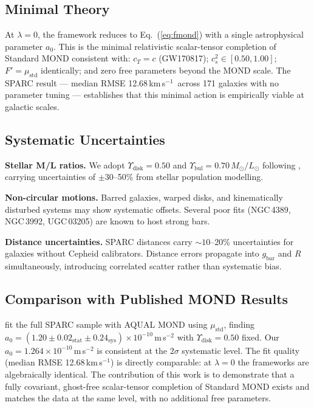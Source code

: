 \documentclass{aa}
\newcommand{\kms}{km\,s$^{-1}$}
\newcommand{\mstd}{\mu_\text{std}}
\newcommand{\gbar}{g_\text{bar}}
\newcommand{\azero}{a_0}
\newcommand{\Upd}{\Upsilon_\text{disk}}
\newcommand{\Upb}{\Upsilon_\text{bul}}
\newcommand{\cs}{c_s^2}
\begin{document}
\subsection{Minimal Theory}

At $\lambda = 0$, the framework reduces to Eq.~(\ref{eq:fmond}) with a single
astrophysical parameter $\azero$. This is the minimal relativistic
scalar-tensor completion of Standard MOND consistent with: $c_T = c$
(GW170817); $\cs \in [0.50, 1.00]$; $F' = \mstd$ identically; and zero free
parameters beyond the MOND scale. The SPARC result --- median RMSE
12.68\,\kms\ across 171 galaxies with no parameter tuning --- establishes that
this minimal action is empirically viable at galactic scales.

\subsection{Systematic Uncertainties}

\textbf{Stellar M/L ratios.} We adopt $\Upd = 0.50$ and $\Upb = 0.70\,M_\odot/L_\odot$
following \citet{McGaugh2015}, carrying uncertainties of $\pm 30$--50\%
from stellar population modelling.

\textbf{Non-circular motions.} Barred galaxies, warped disks, and kinematically
disturbed systems may show systematic offsets. Several poor fits (NGC\,4389,
NGC\,3992, UGC\,03205) are known to host strong bars.

\textbf{Distance uncertainties.} SPARC distances carry $\sim 10$--20\%
uncertainties for galaxies without Cepheid calibrators. Distance errors
propagate into $\gbar$ and $R$ simultaneously, introducing correlated scatter
rather than systematic bias.

\subsection{Comparison with Published MOND Results}

\citet{Li2018} fit the full SPARC sample with AQUAL MOND using $\mstd$,
finding $\azero = (1.20 \pm 0.02_\text{stat} \pm 0.24_\text{sys}) \times
10^{-10}$\,m\,s$^{-2}$ with $\Upd = 0.50$ fixed. Our
$\azero = 1.264 \times 10^{-10}$\,m\,s$^{-2}$ is consistent at the
$2\sigma$ systematic level. The fit quality (median RMSE 12.68\,\kms) is
directly comparable: at $\lambda = 0$ the frameworks are algebraically
identical. The contribution of this work is to demonstrate that a fully
covariant, ghost-free scalar-tensor completion of Standard MOND exists and
matches the data at the same level, with no additional free parameters.
\end{document}
